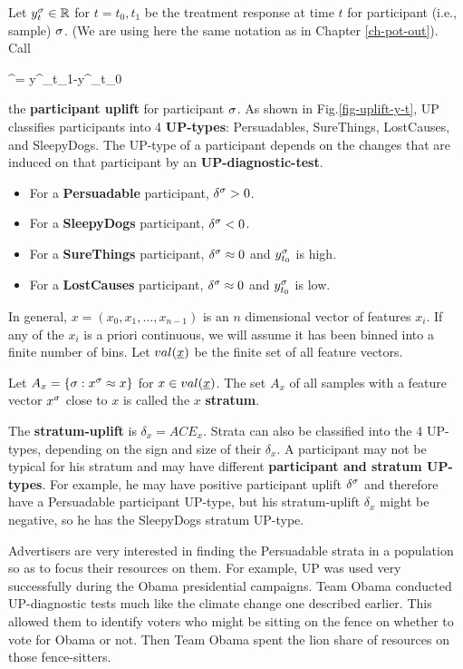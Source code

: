 Let $y^\sigma_t\in { \mathbb{R}}$ for $t=t_0, t_1$
be the treatment response at time $t$
for participant (i.e., sample) $\sigma$. (We are using here
the same notation as in Chapter \ref{ch-pot-out}).
Call 

\beq
\delta^\s=
y^\s_{t_1}-y^\s_{t_0}\eeq

the {\bf participant uplift}
for participant $\sigma$.
As shown
in Fig.\ref{fig-uplift-y-t},
UP classifies participants
into 4 {\bf UP-types}: Persuadables, SureThings, LostCauses,
and SleepyDogs.
The UP-type
of a participant
depends on the changes 
that are induced on that participant
by an {\bf UP-diagnostic-test}.
\begin{itemize}
\item
For a {\bf Persuadable} participant,
$\delta^\sigma>0$.
\item
For a {\bf SleepyDogs}
participant, $\delta^\sigma< 0$.
\item
For a {\bf SureThings} participant,
 $\delta^\sigma\approx 0$
and $y^\sigma_{t_0}$ is high.
\item
For a {\bf LostCauses} participant,
$\delta^\sigma\approx 0$
and $y^\sigma_{t_0}$ is low.
\end{itemize}

In general,
$x=(x_0, x_1,\dots, x_{n-1})$ is an $n$ dimensional 
vector of features $x_i$.
If any of the $x_i$
is a priori continuous, we will
assume it has  been binned into
a finite number of bins.
Let $val(\rvx)$ be the finite set of  all feature vectors.


Let $A_x = \{\sigma: x^\sigma \approx x\}$ for  $x\in val(\rvx)$.
The set $A_x$ of all samples with
a feature vector $x^\sigma$ close to $x$ 
is called the $x$ {\bf stratum}.



The {\bf stratum-uplift} is
 $\delta_x=ACE_x$.
Strata can also be
classified into
the 4 UP-types,
depending on the sign and size  
of their $\delta_x$.
A participant 
may not be typical for
his stratum
and may
have different
{\bf participant and stratum UP-types}.
For example, he may have positive 
participant uplift $\delta^\sigma$
and therefore have a Persuadable participant UP-type,
but his stratum-uplift  $\delta_x$
might be negative, so
he has
the SleepyDogs stratum UP-type.

Advertisers are very interested in finding
the Persuadable strata in a population
so as to focus their resources on them.
For example, UP was used very
successfully during the 
Obama presidential campaigns. 
Team Obama conducted UP-diagnostic
tests much like
the climate change one described earlier.
This allowed them to
identify voters who might be sitting on the fence
on whether to vote for Obama or not.
Then Team Obama spent
the lion share
of  resources  on those
fence-sitters.


